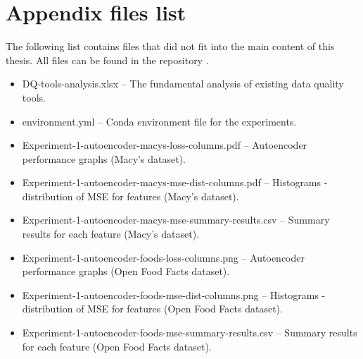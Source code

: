 \chapter{Appendix files list}
\label{ch:appendix_files_list}

	The following list contains files that did not fit into the main content of this thesis. All files can be found in the repository .
	
\begin{itemize}
	\item DQ-tools-analysis.xlsx -- The fundamental analysis of existing data quality tools.
	\item environment.yml -- Conda environment file for the experiments.
	\item Experiment-1-autoencoder-macys-loss-columns.pdf -- Autoencoder performance graphs (Macy's dataset).
	\item Experiment-1-autoencoder-macys-mse-dist-columns.pdf -- Histograms - distribution of MSE for features (Macy's dataset).
	\item Experiment-1-autoencoder-macys-mse-summary-results.csv -- Summary results for each feature (Macy's dataset).
	\item Experiment-1-autoencoder-foods-loss-columns.png -- Autoencoder performance graphs (Open Food Facts dataset).
	\item Experiment-1-autoencoder-foods-mse-dist-columns.png -- Histograms - distribution of MSE for features (Open Food Facts dataset).
	\item Experiment-1-autoencoder-foods-mse-summary-results.csv -- Summary results for each feature (Open Food Facts dataset).
\end{itemize}
